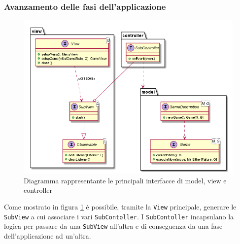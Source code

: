 \subsubsection{Avanzamento delle fasi dell'applicazione}
\begin{figure}
  \centering
  \includegraphics[width=\linewidth]{images/uml/main_class_diagram.png}
  \caption{Diagramma rappresentante le principali interfacce di model, view e controller}
  \label{fig:main_class_diagram}
\end{figure}
Come mostrato in figura \ref{fig:main_class_diagram} è possibile, tramite la \texttt{View} principale, generare le \texttt{SubView} a cui associare i vari \texttt{SubContoller}.
I \texttt{SubContoller} incapsulano la logica per passare da una \texttt{SubView} all'altra e di conseguenza da una fase dell'applicazione ad un'altra.

